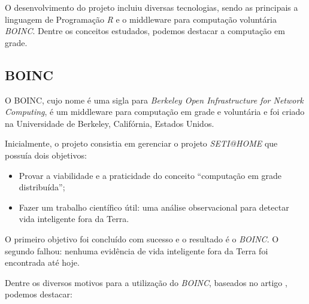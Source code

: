 O desenvolvimento do projeto incluiu diversas tecnologias, sendo as principais a linguagem de Programação \emph{R} e o middleware
para computação voluntária \emph{BOINC}. Dentre os conceitos estudados, podemos destacar a computação em grade.  

\subsection{BOINC}

O BOINC, cujo nome é uma sigla para \textit{Berkeley Open Infrastructure for Network Computing}, é um middleware 
para computação em grade e voluntária e foi criado na Universidade de Berkeley, Califórnia, Estados Unidos.

Inicialmente, o projeto consistia em gerenciar o projeto \textit{SETI@HOME} que possuía dois objetivos:

\begin{itemize}
	\item Provar a viabilidade e a praticidade do conceito ``computação em grade distribuída'';
	\item Fazer um trabalho científico útil: uma análise observacional para detectar vida inteligente fora da Terra.
\end{itemize}

O primeiro objetivo foi concluído com sucesso e o resultado é o \textit{BOINC}. O segundo falhou: nenhuma evidência de 
vida inteligente fora da Terra foi encontrada até hoje. 

Dentre os diversos motivos para a utilização do \emph{BOINC}, baseados no artigo \cite{boinc}, podemos destacar:

